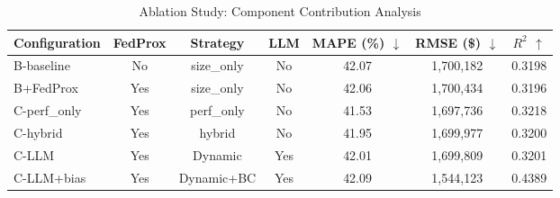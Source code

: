 
\begin{table}[htbp]
\centering
\caption{Ablation Study: Component Contribution Analysis}
\label{tab:ablation}
\begin{tabular}{lcccccc}
\toprule
Configuration & FedProx & Strategy & LLM & MAPE (\%) $\downarrow$ & RMSE (\$) $\downarrow$ & $R^2$ $\uparrow$ \\
\midrule
B-baseline & No & size\_only & No & 42.07 & 1,700,182 & 0.3198 \\
B+FedProx & Yes & size\_only & No & 42.06 & 1,700,434 & 0.3196 \\
C-perf\_only & Yes & perf\_only & No & 41.53 & 1,697,736 & 0.3218 \\
C-hybrid & Yes & hybrid & No & 41.95 & 1,699,977 & 0.3200 \\
C-LLM & Yes & Dynamic & Yes & 42.01 & 1,699,809 & 0.3201 \\
C-LLM+bias & Yes & Dynamic+BC & Yes & 42.09 & 1,544,123 & 0.4389 \\

\bottomrule
\end{tabular}
\end{table}
